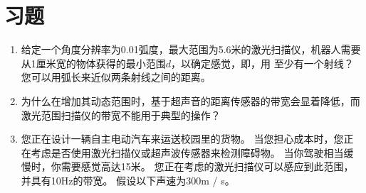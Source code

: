 \section*{习题}\small
\begin{enumerate}

\item 给定一个角度分辨率为0.01弧度，最大范围为5.6米的激光扫描仪，机器人需要从1厘米宽的物体获得的最小范围$ d $，以确定感觉，即，用 至少有一个射线？ 您可以用弧长来近似两条射线之间的距离。
\item 为什么在增加其动态范围时，基于超声音的距离传感器的带宽会显着降低，而激光范围扫描仪的带宽不能用于典型的操作？
\item 您正在设计一辆自主电动汽车来运送校园里的货物。 当您担心成本时，您正在考虑是否使用激光扫描仪或超声波传感器来检测障碍物。 当你驾驶相当缓慢时，你需要感觉高达15米。 您正在考虑的激光扫描仪可以感应到此范围，并具有10Hz的带宽。 假设以下声速为300m / s。

\begin{enumerate}


\end{enumerate}
\end{enumerate}
